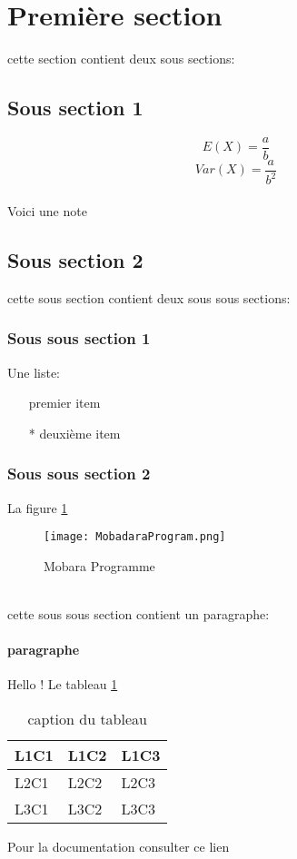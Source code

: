 \section{Première section}
cette section contient deux sous sections:
\subsection{Sous section 1}
$$E(X)=\frac{a}{b}$$ %
\begin{equation}
Var(X)=\frac{a}{b^{2}}
\end{equation} %
\\Voici une note\footnotemark {}
\newpage
\subsection{Sous section 2}
cette sous section contient deux sous sous sections:
\subsubsection{Sous sous section 1}
Une liste:
\begin{itemize}
\item[\textbullet] premier item
\item[*] deuxième item
\end{itemize}
\subsubsection{Sous sous section 2}
La figure \ref{info pour se referer}
\begin{figure}[h]
\centering
\texttt{[image: MobadaraProgram.png]}
\caption{Mobara Programme}  
\label{info pour se referer} 
\end{figure} 
\\cette sous sous section contient un paragraphe:
\paragraph{paragraphe}
Hello ! 
Le tableau \ref{abc}
\begin{table}[h]
\centering
\begin{tabular}{| l | l | l |}
\hline
L1C1 & L1C2 & L1C3 \\
\hline
L2C1 & L2C2 & L2C3 \\
\hline
L3C1 & L3C2 & L3C3 \\
\hline
\end{tabular}
\caption{caption du tableau}
\label{abc}
\end{table}

Pour la documentation consulter ce lien \cite{overleaf}

